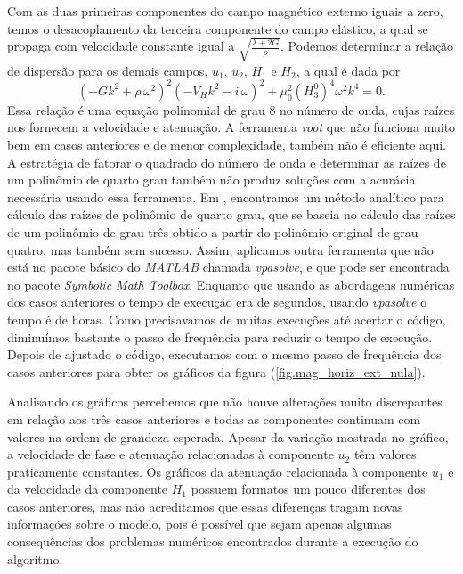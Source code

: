 Com as duas primeiras componentes do campo magn\'etico externo iguais a zero, temos o desacoplamento da terceira componente do campo el\'astico, a qual se propaga com velocidade constante igual a $\sqrt{\frac{\lambda+2G}{\rho}}$. Podemos determinar a rela\c{c}\~ao de dispers\~ao para os demais campos, $u_1$, $u_2$, $H_1$ e $H_2$, a qual \'e dada por
\begin{equation}
(-Gk^2+\rho\,\omega^2)^2(-V_Hk^2-i\,\omega)^2+\mu_0^2(H_3^0)^4\omega^2k^4=0.
\end{equation}
Essa rela\c{c}\~ao \'e uma equa\c{c}\~ao polinomial de grau 8 no n\'umero de onda, cujas ra\'izes nos fornecem a velocidade e atenua\c{c}\~ao. A ferramenta \textit{root} que n\~ao funciona muito bem em casos anteriores e de menor complexidade, tamb\'em n\~ao \'e eficiente aqui. A estrat\'egia de fatorar o quadrado do n\'umero de onda e determinar as ra\'izes de um polin\^omio de quarto grau tamb\'em n\~ao produz solu\c{c}\~oes com a acur\'acia necess\'aria usando essa ferramenta. Em \cite{abramovitz_64}, encontramos um m\'etodo anal\'itico para c\'alculo das ra\'izes de polin\^omio de quarto grau, que se baseia no c\'alculo das ra\'izes de um polin\^omio de grau tr\^es obtido a partir do polin\^omio original de grau quatro, mas tamb\'em sem sucesso. Assim, aplicamos outra ferramenta que n\~ao est\'a no pacote b\'asico do \textit{MATLAB} chamada \textit{vpasolve}, e que pode ser encontrada no pacote \textit{Symbolic Math Toolbox}. Enquanto que usando as abordagens num\'ericas dos casos anteriores o tempo de execu\c{c}\~ao era de segundos, usando \textit{vpasolve} o tempo \'e de horas. Como precisavamos de muitas execu\c{c}\~oes at\'e acertar o c\'odigo, diminu\'imos bastante o passo de frequ\^encia para reduzir o tempo de execu\c{c}\~ao. Depois de ajustado o c\'odigo, executamos com o mesmo passo de frequ\^encia dos casos anteriores para obter os gr\'aficos da figura (\ref{fig.mag_horiz_ext_nula}).

Analisando os gr\'aficos percebemos que n\~ao houve altera\c{c}\~oes muito discrepantes em rela\c{c}\~ao aos tr\^es casos anteriores e todas as componentes continuam com valores na ordem de grandeza esperada. Apesar da varia\c{c}\~ao mostrada no gr\'afico, a velocidade de fase e atenua\c{c}\~ao relacionadas \`a componente $u_2$ t\^em valores praticamente constantes. Os gr\'aficos da atenua\c{c}\~ao relacionada \`a componente $u_1$ e da velocidade da componente $H_1$ possuem formatos um pouco diferentes dos casos anteriores, mas n\~ao acreditamos que essas diferen\c{c}as tragam novas informa\c{c}\~oes sobre o modelo, pois \'e poss\'ivel que sejam apenas algumas consequ\^encias dos problemas num\'ericos encontrados durante a execu\c{c}\~ao do algoritmo.  

